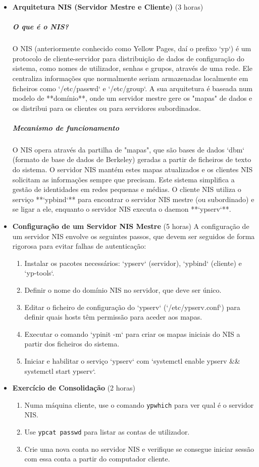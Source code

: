 \documentclass[10pt,a4paper]{article}
\begin{document}
	\begin{itemize}
		\item \textbf{Arquitetura NIS (Servidor Mestre e Cliente)} (3 horas)
		\subparagraph{O que é o NIS?} O NIS (anteriormente conhecido como Yellow Pages, daí o prefixo `yp`) é um protocolo de cliente-servidor para distribuição de dados de configuração do sistema, como nomes de utilizador, senhas e grupos, através de uma rede. Ele centraliza informações que normalmente seriam armazenadas localmente em ficheiros como `/etc/passwd` e `/etc/group`. A sua arquitetura é baseada num modelo de **domínio**, onde um servidor mestre gere os "mapas" de dados e os distribui para os clientes ou para servidores subordinados.
		\subparagraph{Mecanismo de funcionamento} O NIS opera através da partilha de "mapas", que são bases de dados `dbm` (formato de base de dados de Berkeley) geradas a partir de ficheiros de texto do sistema. O servidor NIS mantém estes mapas atualizados e os clientes NIS solicitam as informações sempre que precisam. Este sistema simplifica a gestão de identidades em redes pequenas e médias. O cliente NIS utiliza o serviço **`ypbind`** para encontrar o servidor NIS mestre (ou subordinado) e se ligar a ele, enquanto o servidor NIS executa o daemon **`ypserv`**.
		
		\item \textbf{Configuração de um Servidor NIS Mestre} (5 horas)
		A configuração de um servidor NIS envolve os seguintes passos, que devem ser seguidos de forma rigorosa para evitar falhas de autenticação:
		\begin{enumerate}
			\item Instalar os pacotes necessários: `ypserv` (servidor), `ypbind` (cliente) e `yp-tools`.
			\item Definir o nome do domínio NIS no servidor, que deve ser único.
			\item Editar o ficheiro de configuração do `ypserv` (`/etc/ypserv.conf`) para definir quais hosts têm permissão para aceder aos mapas.
			\item Executar o comando `ypinit -m` para criar os mapas iniciais do NIS a partir dos ficheiros do sistema.
			\item Iniciar e habilitar o serviço `ypserv` com `systemctl enable ypserv && systemctl start ypserv`.
		\end{enumerate}
		
		\item \textbf{Exercício de Consolidação} (2 horas)
		\begin{enumerate}
			\item Numa máquina cliente, use o comando \texttt{ypwhich} para ver qual é o servidor NIS.
			\item Use \texttt{ypcat passwd} para listar as contas de utilizador.
			\item Crie uma nova conta no servidor NIS e verifique se consegue iniciar sessão com essa conta a partir do computador cliente.
		\end{enumerate}
	\end{itemize}
	
\end{document}
